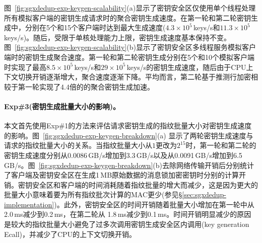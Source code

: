图~\ref{fig:sgxdedup-exp-keygen-scalability}(a)显示了密钥安全区仅使用单个线程处理所有模拟客户端的密钥生成请求时的聚合密钥生成速度。在第一轮和第二轮密钥生成中，\sysnameS 分别在5个和15个客户端时达到最大生成速度($4.3\times 10^5$\,keys/s和$11.3\times 10^5$\,keys/s)。随后，受限于单核处理能力上限，密钥生成速度基本保持不变。图~\ref{fig:sgxdedup-exp-keygen-scalability}(b)显示了密钥安全区多线程服务模拟客户端时的密钥生成聚合速度。第一轮和第二轮密钥生成分别在5个和10个模拟客户端时实现了最高$8.5\times 10^5$\,keys/s和$29\times 10^5$\,keys/s的密钥生成速度，随后由于CPU上下文切换开销逐渐增大，聚合速度逐渐下降。平均而言，第二轮基于推测行加密相较于第一轮实现了4.4倍的的聚合密钥生成加速。

\paragraph*{Exp\#3(密钥生成批量大小的影响)。}

本文首先使用Exp\#1的方法来评估请求密钥生成的指纹批量大小对密钥生成速度的影响。图~\ref{fig:sgxdedup-exp-keygen-breakdown}(a) 显示了两轮密钥生成速度与请求的指纹批量大小的关系。当指纹批量大小从$1$更改为$2^{15}$时，第一轮和第二轮的密钥生成速度分别从0.0086\,GB/s增加到3.3\,GB/s以及从0.0091\,GB/s增加到6.5\,GB/s。图~\ref{fig:sgxdedup-exp-keygen-breakdown}(b)去除网络传输开销后分别统计了客户端及密钥安全区在生成1\,MB原始数据的消息锁加密密钥时分别的计算开销。密钥安全区和客户端的时间消耗随着指纹批量的增大而减少，这是因为更大的批量大小意味着要为所有指纹批次计算的MAC更少(参见\S\ref{sec:sgxdedup-implementation})。此外，密钥安全区的时间开销随着批量大小增加在第一轮中从2.0\,ms减少到0.2\,ms，在第二轮从 1.8\,ms减少到0.1\,ms。时间开销明显减少的原因是较大的指纹批量大小避免了过多次调用密钥生成安全区内调用(key generation Ecall)，并减少了CPU的上下文切换开销。

